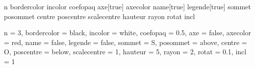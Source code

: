 
 {n}{}
 {bordercolor}{}
 {incolor}{}
 {coefopaq}{}
 {axe}[true]{}
 {axecolor}{}
 {name}[true]{}
 {legende}[true]{}
 {sommet}{}
 {posommet}{}
 {centre}{}
 {poscentre}{}
 {scalecentre}{}
 {hauteur}{}
 {rayon}{}
 {rotat}{}
 {incl}{}

 {
								n = 3,
								bordercolor = black,
 							 	incolor = white,
 							 	coefopaq = 0.5,
 							 	axe = false,
 							 	axecolor = red,
 							 	name = false,
 							 	legende = false,
 							 	sommet = S, 
 							 	posommet = above,							 	
 							 	centre = O,
 							 	poscentre = below,
 							 	scalecentre = 1,
 							 	hauteur = 5,
 							 	rayon = 2,
								rotat = 0.1,
 							 	incl = 1}{}

\newcommand*{\pyramreg}[1][]{\pasPyramreg[#1]}

